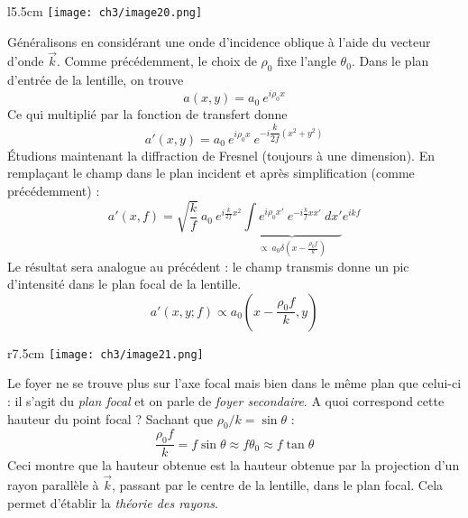 	\begin{wrapfigure}[8]{l}{5.5cm}
	\vspace{-5mm}
	\texttt{[image: ch3/image20.png]}
	\end{wrapfigure}
Généralisons en considérant une onde d'incidence oblique à l'aide du vecteur d'onde $\vec{k}$. Comme 
précédemment, le choix de $\rho_0$ fixe l'angle $\theta_0$. Dans le plan d'entrée de la lentille, on 
trouve
\begin{equation}
a(x,y) = a_0\ e^{i\rho_0x}
\end{equation} 
Ce qui multiplié par la fonction de transfert donne
\begin{equation}
a'(x,y) = a_0\ e^{i\rho_0x}\ e^{-i\dfrac{k}{2f}(x^2+y^2)}
\end{equation}
Étudions maintenant la diffraction de Fresnel (toujours à une dimension). En remplaçant le champ dans 
le plan incident et après simplification (comme précédemment) :
\begin{equation}
a'(x,f) = \sqrt{\frac{k}{f}}\ a_0\ e^{i\frac{k}{2f}x^2} \underbrace{\int e^{i\rho_0x'}\ e^{-i\frac{k}{f}xx'}\ dx'}_{
\propto\ a_0\delta(x-\frac{\rho_0f}{k} )} 
e^{ikf}
\end{equation}
Le résultat sera analogue au précédent : le champ transmis donne un pic d'intensité dans le plan focal de 
la lentille.
\begin{equation}
a'(x,y;f) \propto a_0\left(x-\dfrac{\rho_0f}{k},y\right)
\end{equation}

	\begin{wrapfigure}[8]{r}{7.5cm}
	\vspace{-5mm}
	\texttt{[image: ch3/image21.png]}
	\end{wrapfigure}
Le foyer ne se trouve plus sur l'axe focal mais bien dans le même plan que celui-ci : il s'agit du 
\textit{plan focal} et on parle de \textit{foyer secondaire}. A quoi correspond cette hauteur du 
point focal ? Sachant que $\rho_0/k = \sin\theta$ :
\begin{equation}
\dfrac{\rho_0f}{k} = f\sin\theta \approx f\theta_0 \approx f\tan\theta
\end{equation}
Ceci montre que la hauteur obtenue est la hauteur obtenue par la projection d'un rayon parallèle à $\vec{k}$, 
passant par le centre de la lentille, dans le plan focal. Cela permet d'établir la \textit{théorie des rayons}.\\

